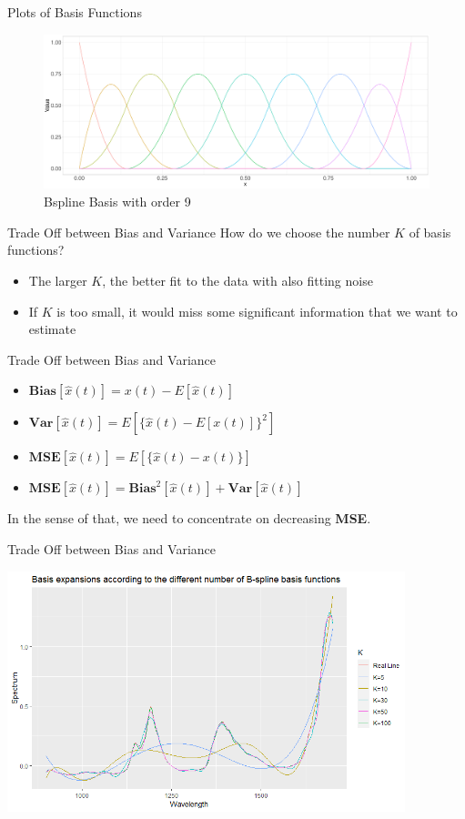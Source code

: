 \documentclass{beamer}
\begin{document}
	\begin{frame}{Plots of Basis Functions}
		\begin{figure}
			\includegraphics[height = 4.5cm]{../Graphics/Bspline_Basis.pdf}
			\caption {Bspline Basis with order 9}
		\end{figure}
	\end{frame}
	
	\begin{frame}{Trade Off between Bias and Variance}
		How do we choose the number $K$ of basis functions?
		\begin{itemize}
			\item The larger $K$, the better fit to the data with also fitting noise
			\item If $K$ is too small, it would miss some significant information that we want to estimate 
		\end{itemize}
	\end{frame}
	
	\begin{frame}{Trade Off between Bias and Variance}
		\begin{itemize}
			\item $\textbf{Bias}[\hat{x}(t)] = x(t) - E[\hat{x}(t)]$
			\item $\textbf{Var}[\hat{x}(t)] = E[\{\hat{x}(t) - E[x(t)]\}^2]$
			\item $\textbf{MSE}[\hat{x}(t)] = E[\{\hat{x}(t) - x(t)\}]$
			\item $\textbf{MSE}[\hat{x}(t)] = \textbf{Bias}^2[\hat{x}(t)] + \textbf{Var}[\hat{x}(t)]$
		\end{itemize}
		In the sense of that, we need to concentrate on decreasing \textbf{MSE}.
	\end{frame}
	
	\begin{frame}{Trade Off between Bias and Variance}
		\begin{minipage}[t]{\textwidth}
			\includegraphics[height = 7cm]{../Graphics/Tradeoff.png}
		\end{minipage}
	\end{frame}
\end{document}

